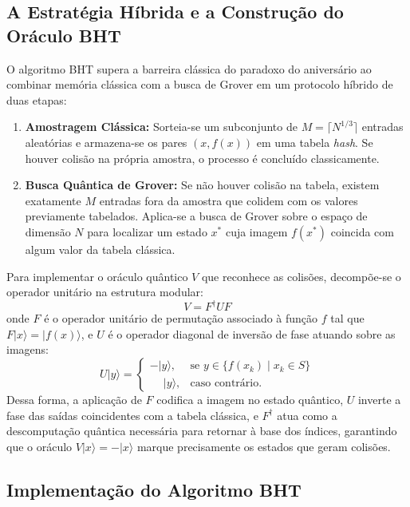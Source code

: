\documentclass[12pt, a4paper]{article}
\newcommand{\ket}[1]{\lvert #1 \rangle}
\begin{document}
\subsection{A Estratégia Híbrida e a Construção do Oráculo BHT}

O algoritmo BHT supera a barreira clássica do paradoxo do aniversário ao combinar memória clássica com a busca de Grover em um protocolo híbrido de duas etapas:

\begin{enumerate}[label=\textbf{\arabic*.}]
    \item \textbf{Amostragem Clássica:} Sorteia-se um subconjunto de $M = \lceil N^{1/3} \rceil$ entradas aleatórias e armazena-se os pares $(x, f(x))$ em uma tabela \textit{hash}. Se houver colisão na própria amostra, o processo é concluído classicamente.
    \item \textbf{Busca Quântica de Grover:} Se não houver colisão na tabela, existem exatamente $M$ entradas fora da amostra que colidem com os valores previamente tabelados. Aplica-se a busca de Grover sobre o espaço de dimensão $N$ para localizar um estado $x^*$ cuja imagem $f(x^*)$ coincida com algum valor da tabela clássica.
\end{enumerate}

Para implementar o oráculo quântico $V$ que reconhece as colisões, decompõe-se o operador unitário na estrutura modular:
\begin{equation}
    V = F^\dagger U F
\end{equation}
onde $F$ é o operador unitário de permutação associado à função $f$ tal que $F\ket{x} = \ket{f(x)}$, e $U$ é o operador diagonal de inversão de fase atuando sobre as imagens:
\begin{equation}
    U\ket{y} = 
    \begin{cases} 
        -\ket{y}, & \text{se } y \in \{f(x_k) \mid x_k \in S\} \\
        \phantom{-}\ket{y}, & \text{caso contrário.}
    \end{cases}
\end{equation}
Dessa forma, a aplicação de $F$ codifica a imagem no estado quântico, $U$ inverte a fase das saídas coincidentes com a tabela clássica, e $F^\dagger$ atua como a descomputação quântica necessária para retornar à base dos índices, garantindo que o oráculo $V\ket{x} = -\ket{x}$ marque precisamente os estados que geram colisões.

\subsection{Implementação do Algoritmo BHT}
\end{document}
